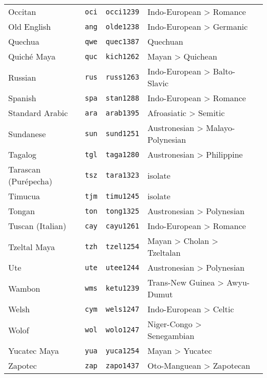 \begin{longtable}[h]{ l l l l l }
  Occitan                          & \texttt{oci}       & \texttt{occi1239}   & Indo-European > Romance\\
  Old English                      & \texttt{ang}       & \texttt{olde1238}   & Indo-European > Germanic\\
  Quechua                          & \texttt{qwe}       & \texttt{quec1387}   & Quechuan\\
  Quiché Maya                      & \texttt{quc}       & \texttt{kich1262}   & Mayan > Quichean\\
  Russian                          & \texttt{rus}       & \texttt{russ1263}   & Indo-European > Balto-Slavic\\
  Spanish                          & \texttt{spa}       & \texttt{stan1288}   & Indo-European > Romance\\
  Standard Arabic                  & \texttt{ara}       & \texttt{arab1395}   & Afroasiatic > Semitic\\
  Sundanese                        & \texttt{sun}       & \texttt{sund1251}   & Austronesian > Malayo-Polynesian\\
  Tagalog                          & \texttt{tgl}       & \texttt{taga1280}   & Austronesian > Philippine\\
  Tarascan (Purépecha)             & \texttt{tsz}       & \texttt{tara1323}   & isolate\\
  Timucua                          & \texttt{tjm}       & \texttt{timu1245}   & isolate\\
  Tongan                           & \texttt{ton}       & \texttt{tong1325}   & Austronesian > Polynesian\\
  Tuscan (Italian)                 & \texttt{cay}       & \texttt{cayu1261}   & Indo-European > Romance\\
  Tzeltal Maya                     & \texttt{tzh}       & \texttt{tzel1254}   & Mayan > Cholan > Tzeltalan\\
  Ute                              & \texttt{ute}       & \texttt{utee1244}   & Austronesian > Polynesian\\
  Wambon                           & \texttt{wms}       & \texttt{ketu1239}   & Trans-New Guinea > Awyu-Dumut\\
  Welsh                            & \texttt{cym}       & \texttt{wels1247}   & Indo-European > Celtic\\
  Wolof                            & \texttt{wol}       & \texttt{wolo1247}   & Niger-Congo > Senegambian\\
  Yucatec Maya                     & \texttt{yua}       & \texttt{yuca1254}   & Mayan > Yucatec\\
  Zapotec                          & \texttt{zap}       & \texttt{zapo1437}   & Oto-Manguean > Zapotecan\\
\end{longtable}
